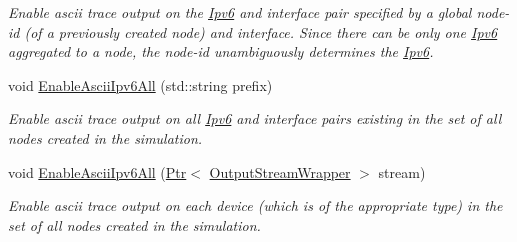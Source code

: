 \begin{DoxyCompactItemize}
\begin{DoxyCompactList}\small\item\em Enable ascii trace output on the \hyperlink{classns3_1_1Ipv6}{Ipv6} and interface pair specified by a global node-\/id (of a previously created node) and interface. Since there can be only one \hyperlink{classns3_1_1Ipv6}{Ipv6} aggregated to a node, the node-\/id unambiguously determines the \hyperlink{classns3_1_1Ipv6}{Ipv6}. \end{DoxyCompactList}\item 
void \hyperlink{classns3_1_1AsciiTraceHelperForIpv6_a16a8b52f7e593006ccbb5f0e13fa69f0}{Enable\+Ascii\+Ipv6\+All} (std\+::string prefix)
\begin{DoxyCompactList}\small\item\em Enable ascii trace output on all \hyperlink{classns3_1_1Ipv6}{Ipv6} and interface pairs existing in the set of all nodes created in the simulation. \end{DoxyCompactList}\item 
void \hyperlink{classns3_1_1AsciiTraceHelperForIpv6_acd620aa634b89d36c4d86c9d113675e6}{Enable\+Ascii\+Ipv6\+All} (\hyperlink{classns3_1_1Ptr}{Ptr}$<$ \hyperlink{classns3_1_1OutputStreamWrapper}{Output\+Stream\+Wrapper} $>$ stream)
\begin{DoxyCompactList}\small\item\em Enable ascii trace output on each device (which is of the appropriate type) in the set of all nodes created in the simulation. \end{DoxyCompactList}\end{DoxyCompactItemize}
